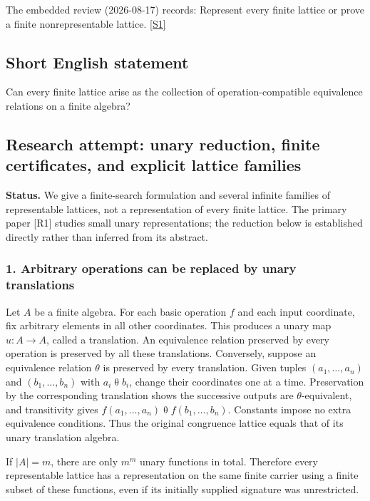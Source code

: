 \documentclass[11pt,a4paper]{article}
\newcommand{\sref}[2]{\hyperlink{source:#1:#2}{[S#2]}}
\begin{document}
The embedded review (2026-08-17) records: Represent every finite lattice or prove a finite nonrepresentable lattice. \sref{statement}{1}

\subsection{Short English statement}

Can every finite lattice arise as the collection of operation-compatible equivalence relations on a finite algebra?

\subsection{Research attempt: unary reduction, finite certificates, and explicit lattice families}
\textbf{Status.} We give a finite-search formulation and several infinite families of representable lattices, not a representation of every finite lattice. The primary paper [R1] studies small unary representations; the reduction below is established directly rather than inferred from its abstract.

\subsubsection{1. Arbitrary operations can be replaced by unary translations}
Let $A$ be a finite algebra. For each basic operation $f$ and each input coordinate, fix arbitrary elements in all other coordinates. This produces a unary map $u:A\to A$, called a translation. An equivalence relation preserved by every operation is preserved by all these translations. Conversely, suppose an equivalence relation $\theta$ is preserved by every translation. Given tuples $(a_1,\ldots,a_n)$ and $(b_1,\ldots,b_n)$ with $a_i\mathrel\theta b_i$, change their coordinates one at a time. Preservation by the corresponding translation shows the successive outputs are $\theta$-equivalent, and transitivity gives $f(a_1,\ldots,a_n)\mathrel\theta f(b_1,\ldots,b_n)$. Constants impose no extra equivalence conditions. Thus the original congruence lattice equals that of its unary translation algebra.

If $|A|=m$, there are only $m^m$ unary functions in total. Therefore every representable lattice has a representation on the same finite carrier using a finite subset of these functions, even if its initially supplied signature was unrestricted.
\end{document}
